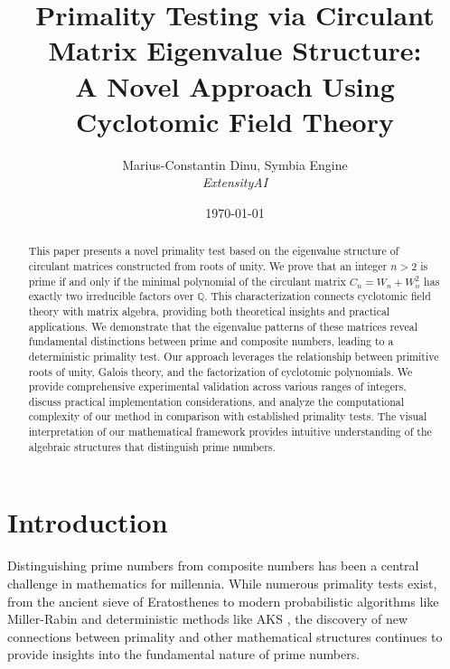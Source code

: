 \newtheorem{theorem}{Theorem}
\newtheorem{lemma}[theorem]{Lemma}
\newtheorem{corollary}[theorem]{Corollary}
\newtheorem{proposition}[theorem]{Proposition}
\newtheorem{definition}[theorem]{Definition}
\newtheorem{remark}[theorem]{Remark}
\newtheorem{example}{Example}

\title{Primality Testing via Circulant Matrix Eigenvalue Structure:\\
A Novel Approach Using Cyclotomic Field Theory}

\author{Marius-Constantin Dinu, Symbia Engine\\
\textit{ExtensityAI}}

\date{\today}



\maketitle

\begin{abstract}
This paper presents a novel primality test based on the eigenvalue structure of circulant matrices constructed from roots of unity. We prove that an integer $n > 2$ is prime if and only if the minimal polynomial of the circulant matrix $C_n = W_n + W_n^2$ has exactly two irreducible factors over $\mathbb{Q}$. This characterization connects cyclotomic field theory with matrix algebra, providing both theoretical insights and practical applications. We demonstrate that the eigenvalue patterns of these matrices reveal fundamental distinctions between prime and composite numbers, leading to a deterministic primality test. Our approach leverages the relationship between primitive roots of unity, Galois theory, and the factorization of cyclotomic polynomials. We provide comprehensive experimental validation across various ranges of integers, discuss practical implementation considerations, and analyze the computational complexity of our method in comparison with established primality tests. The visual interpretation of our mathematical framework provides intuitive understanding of the algebraic structures that distinguish prime numbers.
\end{abstract}

\section{Introduction}

Distinguishing prime numbers from composite numbers has been a central challenge in mathematics for millennia. While numerous primality tests exist, from the ancient sieve of Eratosthenes to modern probabilistic algorithms like Miller-Rabin \cite{rabin1980probabilistic} and deterministic methods like AKS \cite{agrawal2004primes}, the discovery of new connections between primality and other mathematical structures continues to provide insights into the fundamental nature of prime numbers.

